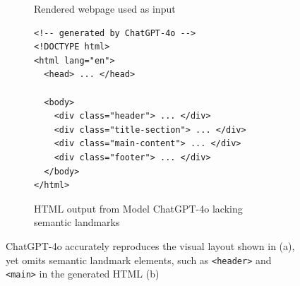

  




\newpage





\lstset{
  language=HTML,
  basicstyle=\ttfamily\scriptsize,
  numbers=left,
  frame=single
}

\begin{figure}
  \centering
  \begin{subfigure}[t]{0.46\textwidth}
    \caption{Rendered webpage used as input}
    \label{fig:webpage}
  \end{subfigure}\hfill
  \begin{subfigure}[t]{0.48\textwidth}
    \vspace{0pt}%
    \begin{lstlisting}
<!-- generated by ChatGPT-4o -->
<!DOCTYPE html>
<html lang="en">
  <head> ... </head>

  <body>
    <div class="header"> ... </div>
    <div class="title-section"> ... </div>
    <div class="main-content"> ... </div>
    <div class="footer"> ... </div>
  </body>
</html>
    \end{lstlisting}
    \caption{HTML output from Model ChatGPT-4o lacking semantic landmarks}
    \label{lst:html}
  \end{subfigure}
  \caption{ChatGPT-4o accurately reproduces the visual layout shown in (a), yet omits semantic landmark elements, such as \texttt{<header>} and \texttt{<main>} in the generated HTML (b)}
  \label{fig:landmarkcomparison}
\end{figure}









